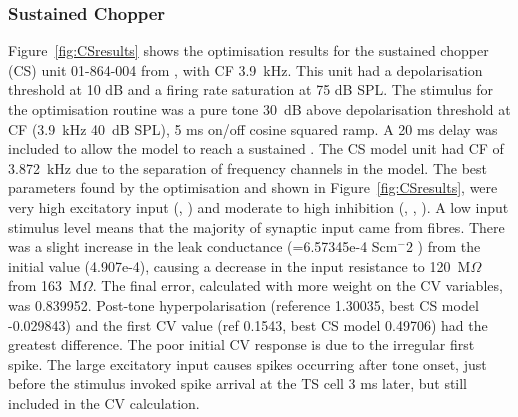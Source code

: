 \subsubsection{Sustained Chopper}

Figure~\ref{fig:CSresults} shows the optimisation results for the sustained chopper (CS) unit 01-864-004 from \citep{PaoliniClareyEtAl:2005}, with CF 3.9~kHz.
This unit had a depolarisation threshold at 10 dB and a firing rate saturation at 75 dB SPL.
The stimulus for the optimisation routine was a pure tone 30~dB above depolarisation threshold at CF (3.9~kHz 40~dB SPL), 5 ms on/off cosine squared ramp.
A 20 ms delay was included to allow the model to reach a sustained \RMP. The CS model unit had CF of 3.872~kHz due to the separation of frequency channels in the model.
The best parameters found by the optimisation and shown in Figure~\ref{fig:CSresults}, were very high excitatory input (, ) and moderate to high inhibition (, , ).
A low input stimulus level means that the majority of synaptic input came from \HSR fibres.
There was a slight increase in the leak conductance (\gleak=6.57345e-4 Scm$^-2$ ) from the initial value (4.907e-4), causing a decrease in the input resistance to 120~M$\Omega$ from 163~M$\Omega$.
The final error, calculated with more weight on the CV variables, was 0.839952.
Post-tone hyperpolarisation (reference 1.30035, best CS model -0.029843) and the first CV value (ref 0.1543, best CS model 0.49706) had the greatest difference.
The poor initial CV response is due to the irregular first spike.
The large excitatory \HSR input causes spikes occurring after tone onset, just before the stimulus invoked spike arrival at the TS cell 3 ms later, but still included in the CV calculation.



